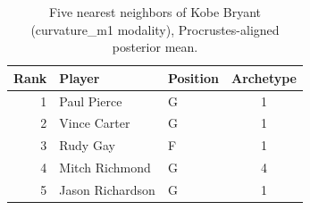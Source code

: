 \begin{table}[htbp]
  \centering\small
  \begin{tabular}{rllc}
    \toprule
    Rank & Player & Position & Archetype \\
    \midrule
    1 & Paul Pierce & G & 1 \\
    2 & Vince Carter & G & 1 \\
    3 & Rudy Gay & F & 1 \\
    4 & Mitch Richmond & G & 4 \\
    5 & Jason Richardson & G & 1 \\
    \bottomrule
  \end{tabular}
  \caption{Five nearest neighbors of Kobe Bryant (curvature_m1 modality), Procrustes-aligned posterior mean.}
  \label{tab:Kobe_Bryant_neighbors_curvature_m1}
\end{table}

